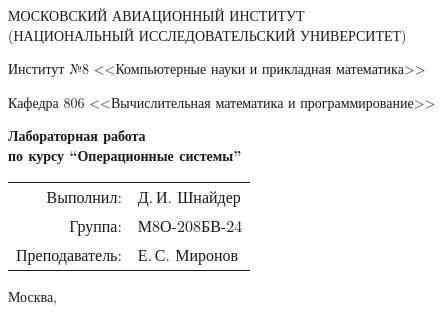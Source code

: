 \begin{titlepage}
\begin{center}
\large
МОСКОВСКИЙ АВИАЦИОННЫЙ ИНСТИТУТ\\ (НАЦИОНАЛЬНЫЙ ИССЛЕДОВАТЕЛЬСКИЙ УНИВЕРСИТЕТ)

\vspace{20pt}

Институт №8 <<Компьютерные науки и прикладная математика>>

Кафедра 806 <<Вычислительная математика и программирование>>
\end{center}

\vspace{60pt}

\begin{center}
\bfseries
\large
Лабораторная работа  \\по курсу \enquote{Операционные системы}

\vspace{54pt}

\end{center}

\vfill

\begin{flushright}
\large
\begin{tabular}{rl}
Выполнил: & Д.\,И. Шнайдер \\
Группа: & М8О-208БВ-24 \\
Преподаватель: & Е.\,С. Миронов \\
\end{tabular}
\end{flushright}

\vspace{92pt}

\begin{center}
\large
Москва, \the\year
\end{center}
\end{titlepage}

\pagebreak
